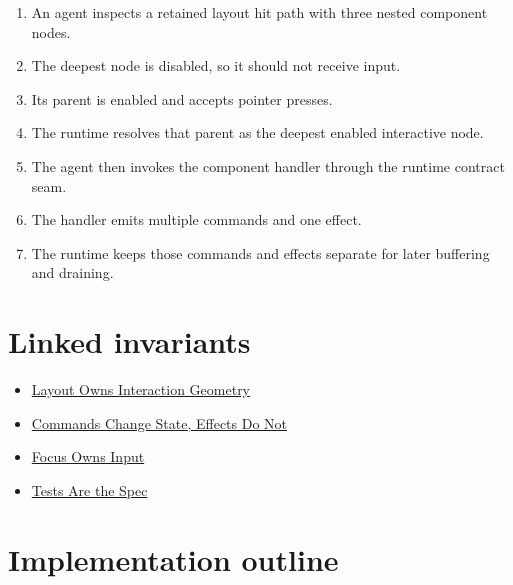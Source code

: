 \begin{enumerate}
\def\labelenumi{\arabic{enumi}.}
\tightlist
\item
  An agent inspects a retained layout hit path with three nested component nodes.
\item
  The deepest node is disabled, so it should not receive input.
\item
  Its parent is enabled and accepts pointer presses.
\item
  The runtime resolves that parent as the deepest enabled interactive node.
\item
  The agent then invokes the component handler through the runtime contract seam.
\item
  The handler emits multiple commands and one effect.
\item
  The runtime keeps those commands and effects separate for later buffering and draining.
\end{enumerate}

\section{Linked invariants}\label{record-154-linked-invariants}

\begin{itemize}
\tightlist
\item
  \href{https://github.com/flyingrobots/bijou/blob/cbd70612140e7a450d764b3c7be1c6af878b99bc/docs/invariants/layout-owns-interaction-geometry.md}{Layout Owns Interaction Geometry}
\item
  \href{https://github.com/flyingrobots/bijou/blob/cbd70612140e7a450d764b3c7be1c6af878b99bc/docs/invariants/commands-change-state-effects-do-not.md}{Commands Change State, Effects Do Not}
\item
  \href{https://github.com/flyingrobots/bijou/blob/cbd70612140e7a450d764b3c7be1c6af878b99bc/docs/invariants/focus-owns-input.md}{Focus Owns Input}
\item
  \href{https://github.com/flyingrobots/bijou/blob/cbd70612140e7a450d764b3c7be1c6af878b99bc/docs/invariants/tests-are-the-spec.md}{Tests Are the Spec}
\end{itemize}

\section{Implementation outline}\label{record-154-implementation-outline}

